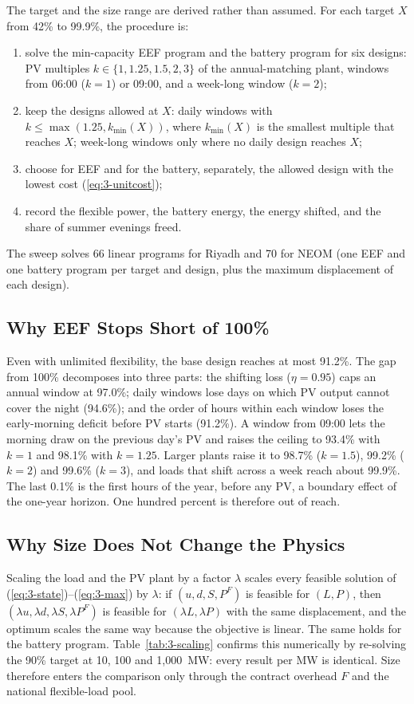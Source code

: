 The target and the size range are derived rather than assumed. For each target $X$ from 42\% to 99.9\%, the procedure is:
\begin{enumerate}
\item solve the min-capacity EEF program and the battery program for six designs: PV multiples $k\in\{1,1.25,1.5,2,3\}$ of the annual-matching plant, windows from 06:00 ($k=1$) or 09:00, and a week-long window ($k=2$);
\item keep the designs allowed at $X$: daily windows with $k\le\max(1.25,k_{\min}(X))$, where $k_{\min}(X)$ is the smallest multiple that reaches $X$; week-long windows only where no daily design reaches $X$;
\item choose for EEF and for the battery, separately, the allowed design with the lowest cost (\ref{eq:3-unitcost});
\item record the flexible power, the battery energy, the energy shifted, and the share of summer evenings freed.
\end{enumerate}
The sweep solves 66 linear programs for Riyadh and 70 for NEOM (one EEF and one battery program per target and design, plus the maximum displacement of each design).

\subsection{Why EEF Stops Short of 100\%}

Even with unlimited flexibility, the base design reaches at most 91.2\%. The gap from 100\% decomposes into three parts: the shifting loss ($\eta=0.95$) caps an annual window at 97.0\%; daily windows lose days on which PV output cannot cover the night (94.6\%); and the order of hours within each window loses the early-morning deficit before PV starts (91.2\%). A window from 09:00 lets the morning draw on the previous day's PV and raises the ceiling to 93.4\% with $k=1$ and 98.1\% with $k=1.25$. Larger plants raise it to 98.7\% ($k=1.5$), 99.2\% ($k=2$) and 99.6\% ($k=3$), and loads that shift across a week reach about 99.9\%. The last 0.1\% is the first hours of the year, before any PV, a boundary effect of the one-year horizon. One hundred percent is therefore out of reach.

\subsection{Why Size Does Not Change the Physics}\label{sec:3-7-3}

Scaling the load and the PV plant by a factor $\lambda$ scales every feasible solution of (\ref{eq:3-state})--(\ref{eq:3-max}) by $\lambda$: if $(u,d,S,P^F)$ is feasible for $(L,P)$, then $(\lambda u,\lambda d,\lambda S,\lambda P^F)$ is feasible for $(\lambda L,\lambda P)$ with the same displacement, and the optimum scales the same way because the objective is linear. The same holds for the battery program. Table~\ref{tab:3-scaling} confirms this numerically by re-solving the 90\% target at 10, 100 and 1,000~MW: every result per MW is identical. Size therefore enters the comparison only through the contract overhead $F$ and the national flexible-load pool.


